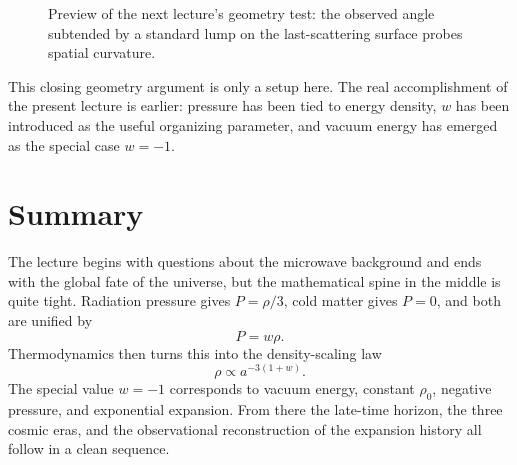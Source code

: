 \begin{figure}
\centering
{}
\caption{Preview of the next lecture's geometry test: the observed angle subtended by a standard lump on the last-scattering surface probes spatial curvature.}
\end{figure}

This closing geometry argument is only a setup here. The real accomplishment of the present lecture is earlier: pressure has been tied to energy density, \(w\) has been introduced as the useful organizing parameter, and vacuum energy has emerged as the special case \(w=-1\).

\section{Summary}

The lecture begins with questions about the microwave background and ends with the global fate of the universe, but the mathematical spine in the middle is quite tight. Radiation pressure gives \(P=\rho/3\), cold matter gives \(P=0\), and both are unified by
\begin{equation}
P=w\rho .
\end{equation}
Thermodynamics then turns this into the density-scaling law
\begin{equation}
\rho\propto a^{-3(1+w)}.
\end{equation}
The special value \(w=-1\) corresponds to vacuum energy, constant \(\rho_0\), negative pressure, and exponential expansion. From there the late-time horizon, the three cosmic eras, and the observational reconstruction of the expansion history all follow in a clean sequence.